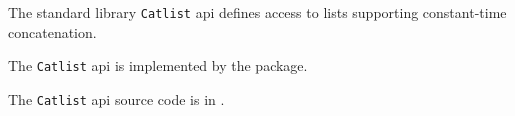 
The standard library {\tt Catlist} api defines access to lists supporting constant-time concatenation.

The {\tt Catlist} api is implemented by the  package.

The {\tt Catlist} api source code is in .
